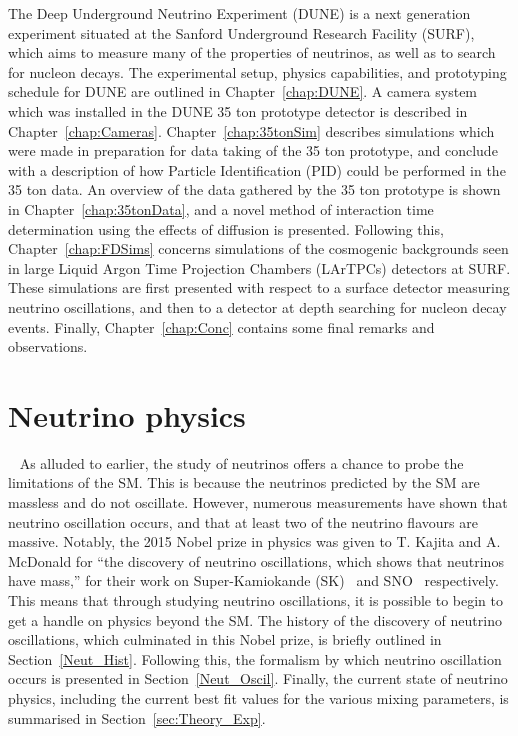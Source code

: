 The Deep Underground Neutrino Experiment (DUNE) is a next generation experiment situated at the Sanford Underground Research Facility (SURF), which aims to measure many of the properties of neutrinos, as well as to search for nucleon decays. The experimental setup, physics capabilities, and prototyping schedule for DUNE are outlined in Chapter~\ref{chap:DUNE}. A camera system which was installed in the DUNE 35 ton prototype detector is described in Chapter~\ref{chap:Cameras}. Chapter~\ref{chap:35tonSim} describes simulations which were made in preparation for data taking of the 35 ton prototype, and conclude with a description of how Particle Identification (PID) could be performed in the 35 ton data. An overview of the data gathered by the 35 ton prototype is shown in Chapter~\ref{chap:35tonData}, and a novel method of interaction time determination using the effects of diffusion is presented. Following this, Chapter~\ref{chap:FDSims} concerns simulations of the cosmogenic backgrounds seen in large Liquid Argon Time Projection Chambers (LArTPCs) detectors at SURF. These simulations are first presented with respect to a surface detector measuring neutrino oscillations, and then to a detector at depth searching for nucleon decay events. Finally, Chapter~\ref{chap:Conc} contains some final remarks and observations. \\

\section{Neutrino physics} ~\label{sec:NeutPhys}  %
As alluded to earlier, the study of neutrinos offers a chance to probe the limitations of the SM. This is because the neutrinos predicted by the SM are massless and do not oscillate. However, numerous measurements have shown that neutrino oscillation occurs, and that at least two of the neutrino flavours are massive. Notably, the 2015 Nobel prize in physics was given to T. Kajita and A. McDonald for ``the discovery of neutrino oscillations, which shows that neutrinos have mass,'' for their work on Super-Kamiokande (SK)~\citep{PhysRevLett.81.1562} and SNO~\citep{PhysRevLett.89.011301} respectively. This means that through studying neutrino oscillations, it is possible to begin to get a handle on physics beyond the SM. The history of the discovery of neutrino oscillations, which culminated in this Nobel prize, is briefly outlined in Section~\ref{Neut_Hist}. Following this, the formalism by which neutrino oscillation occurs is presented in Section~\ref{Neut_Oscil}. Finally, the current state of neutrino physics, including the current best fit values for the various mixing parameters, is summarised in Section~\ref{sec:Theory_Exp}. \\

